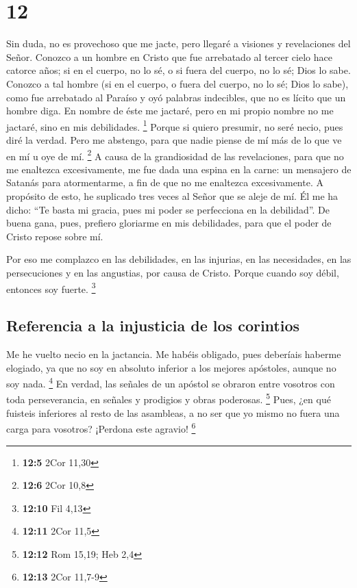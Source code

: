\hypertarget{section-11}{%
\section{12}\label{section-11}}

 Sin duda, no es provechoso que me jacte, pero llegaré a
visiones y revelaciones del Señor.  Conozco a un hombre en
Cristo que fue arrebatado al tercer cielo hace catorce años; si en el
cuerpo, no lo sé, o si fuera del cuerpo, no lo sé; Dios lo sabe.
 Conozco a tal hombre (si en el cuerpo, o fuera del
cuerpo, no lo sé; Dios lo sabe),  como fue arrebatado al
Paraíso y oyó palabras indecibles, que no es lícito que un hombre diga.
 En nombre de éste me jactaré, pero en mi propio nombre no
me jactaré, sino en mis debilidades. \footnote{\textbf{12:5} 2Cor 11,30}
 Porque si quiero presumir, no seré necio, pues diré la
verdad. Pero me abstengo, para que nadie piense de mí más de lo que ve
en mí u oye de mí. \footnote{\textbf{12:6} 2Cor 10,8}  A
causa de la grandiosidad de las revelaciones, para que no me enaltezca
excesivamente, me fue dada una espina en la carne: un mensajero de
Satanás para atormentarme, a fin de que no me enaltezca excesivamente.
 A propósito de esto, he suplicado tres veces al Señor que
se aleje de mí.  Él me ha dicho: ``Te basta mi gracia,
pues mi poder se perfecciona en la debilidad''. De buena gana, pues,
prefiero gloriarme en mis debilidades, para que el poder de Cristo
repose sobre mí.

 Por eso me complazco en las debilidades, en las
injurias, en las necesidades, en las persecuciones y en las angustias,
por causa de Cristo. Porque cuando soy débil, entonces soy fuerte.
\footnote{\textbf{12:10} Fil 4,13}

\hypertarget{referencia-a-la-injusticia-de-los-corintios}{%
\subsection{Referencia a la injusticia de los
corintios}\label{referencia-a-la-injusticia-de-los-corintios}}

 Me he vuelto necio en la jactancia. Me habéis obligado,
pues deberíais haberme elogiado, ya que no soy en absoluto inferior a
los mejores apóstoles, aunque no soy nada. \footnote{\textbf{12:11} 2Cor
  11,5}  En verdad, las señales de un apóstol se obraron
entre vosotros con toda perseverancia, en señales y prodigios y obras
poderosas. \footnote{\textbf{12:12} Rom 15,19; Heb 2,4} 
Pues, ¿en qué fuisteis inferiores al resto de las asambleas, a no ser
que yo mismo no fuera una carga para vosotros? ¡Perdona este agravio!
\footnote{\textbf{12:13} 2Cor 11,7-9}

